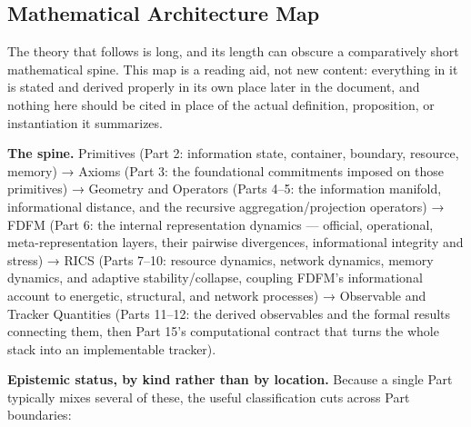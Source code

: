 \documentclass[
]{article}
\begin{document}
\hypertarget{mathematical-architecture-map}{%
\subsection{Mathematical Architecture
Map}\label{mathematical-architecture-map}}

The theory that follows is long, and its length can obscure a
comparatively short mathematical spine. This map is a reading aid, not
new content: everything in it is stated and derived properly in its own
place later in the document, and nothing here should be cited in place
of the actual definition, proposition, or instantiation it summarizes.

\textbf{The spine.} Primitives (Part 2: information state, container,
boundary, resource, memory) → Axioms (Part 3: the foundational
commitments imposed on those primitives) → Geometry and Operators (Parts
4--5: the information manifold, informational distance, and the
recursive aggregation/projection operators) → FDFM (Part 6: the internal
representation dynamics --- official, operational, meta-representation
layers, their pairwise divergences, informational integrity and stress)
→ RICS (Parts 7--10: resource dynamics, network dynamics, memory
dynamics, and adaptive stability/collapse, coupling FDFM's informational
account to energetic, structural, and network processes) → Observable
and Tracker Quantities (Parts 11--12: the derived observables and the
formal results connecting them, then Part 15's computational contract
that turns the whole stack into an implementable tracker).

\textbf{Epistemic status, by kind rather than by location.} Because a
single Part typically mixes several of these, the useful classification
cuts across Part boundaries:
\end{document}
